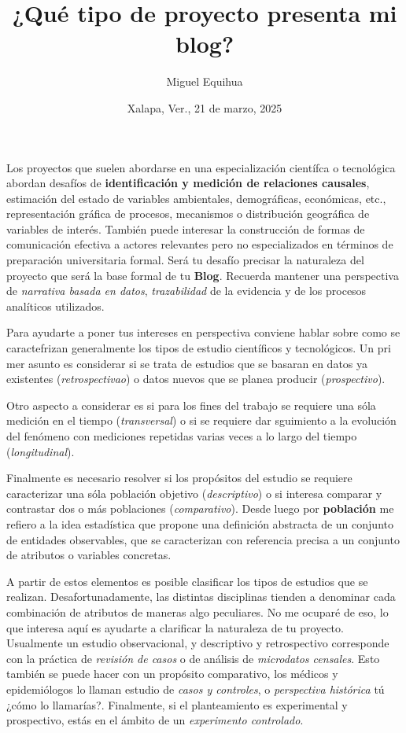 \documentclass[
  letterpaper,
  DIV=11,
  numbers=noendperiod]{scrartcl}
\title{¿Qué tipo de proyecto presenta mi blog?}
\author{Miguel Equihua}
\date{Xalapa, Ver., 21 de marzo, 2025}
\begin{document}
\maketitle


Los proyectos que suelen abordarse en una especialización científca o
tecnológica abordan desafíos de \textbf{identificación y medición de
relaciones causales}, estimación del estado de variables ambientales,
demográficas, económicas, etc., representación gráfica de procesos,
mecanismos o distribución geográfica de variables de interés. También
puede interesar la construcción de formas de comunicación efectiva a
actores relevantes pero no especializados en términos de preparación
universitaria formal. Será tu desafío precisar la naturaleza del
proyecto que será la base formal de tu \textbf{Blog}. Recuerda mantener
una perspectiva de \emph{narrativa basada en datos}, \emph{trazabilidad}
de la evidencia y de los procesos analíticos utilizados.

Para ayudarte a poner tus intereses en perspectiva conviene hablar sobre
como se caractefrizan generalmente los tipos de estudio científicos y
tecnológicos. Un pri mer asunto es considerar si se trata de estudios
que se basaran en datos ya existentes (\emph{retrospectivao}) o datos
nuevos que se planea producir (\emph{prospectivo}).

Otro aspecto a considerar es si para los fines del trabajo se requiere
una sóla medición en el tiempo (\emph{transversal}) o si se requiere dar
sguimiento a la evolución del fenómeno con mediciones repetidas varias
veces a lo largo del tiempo (\emph{longitudinal}).

Finalmente es necesario resolver si los propósitos del estudio se
requiere caracterizar una sóla población objetivo (\emph{descriptivo}) o
si interesa comparar y contrastar dos o más poblaciones
(\emph{comparativo}). Desde luego por \textbf{población} me refiero a la
idea estadística que propone una definición abstracta de un conjunto de
entidades observables, que se caracterizan con referencia precisa a un
conjunto de atributos o variables concretas.

A partir de estos elementos es posible clasificar los tipos de estudios
que se realizan. Desafortunadamente, las distintas disciplinas tienden a
denominar cada combinación de atributos de maneras algo peculiares. No
me ocuparé de eso, lo que interesa aquí es ayudarte a clarificar la
naturaleza de tu proyecto. Usualmente un estudio observacional, y
descriptivo y retrospectivo corresponde con la práctica de
\emph{revisión de casos} o de análisis de \emph{microdatos censales}.
Esto también se puede hacer con un propósito comparativo, los médicos y
epidemiólogos lo llaman estudio de \emph{casos y controles}, o
\emph{perspectiva histórica} tú ¿cómo lo llamarías?. Finalmente, si el
planteamiento es experimental y prospectivo, estás en el ámbito de un
\emph{experimento controlado}.
\end{document}
